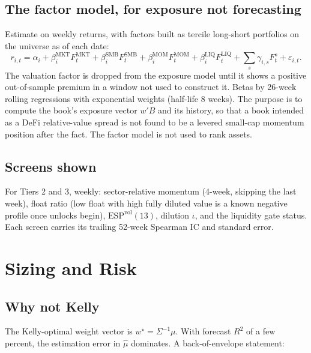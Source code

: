 \documentclass[11pt,a4paper]{article}
\theoremstyle{definition}
\begin{document}
\subsection{The factor model, for exposure not forecasting}

Estimate on weekly returns, with factors built as tercile long-short portfolios on the universe as of each date:
\begin{equation}
r_{i,t} = \alpha_i + \beta^{\mathrm{MKT}}_i F^{\mathrm{MKT}}_t + \beta^{\mathrm{SMB}}_i F^{\mathrm{SMB}}_t + \beta^{\mathrm{MOM}}_i F^{\mathrm{MOM}}_t + \beta^{\mathrm{LIQ}}_i F^{\mathrm{LIQ}}_t + \sum_s \gamma_{i,s}F^s_t + \varepsilon_{i,t}.
\end{equation}
The valuation factor is dropped from the exposure model until it shows a positive out-of-sample premium in a window not used to construct it. Betas by 26-week rolling regressions with exponential weights (half-life 8 weeks). The purpose is to compute the book's exposure vector $w'B$ and its history, so that a book intended as a DeFi relative-value spread is not found to be a levered small-cap momentum position after the fact. The factor model is not used to rank assets.

\subsection{Screens shown}

For Tiers 2 and 3, weekly: sector-relative momentum (4-week, skipping the last week), float ratio (low float with high fully diluted value is a known negative profile once unlocks begin), $\mathrm{ESP}^{\mathrm{vol}}(13)$, dilution $\iota$, and the liquidity gate status. Each screen carries its trailing 52-week Spearman IC and standard error.

\section{Sizing and Risk}\label{sec:sizing}

\subsection{Why not Kelly}

The Kelly-optimal weight vector is $w^\star = \Sigma^{-1}\mu$. With forecast $R^2$ of a few percent, the estimation error in $\hat\mu$ dominates. A back-of-envelope statement:
\end{document}
